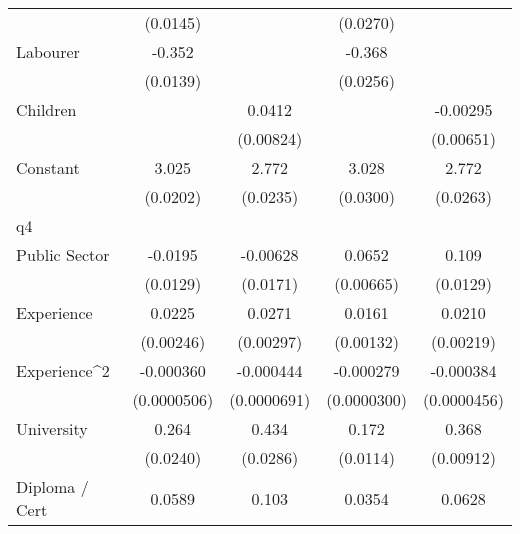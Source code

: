 {\begin{tabular}{l*{4}{c}}
                    &    (0.0145)         &                     &    (0.0270)         &                     \\
[1em]
Labourer            &      -0.352\sym{***}&                     &      -0.368\sym{***}&                     \\
                    &    (0.0139)         &                     &    (0.0256)         &                     \\
[1em]
Children            &                     &      0.0412\sym{***}&                     &    -0.00295         \\
                    &                     &   (0.00824)         &                     &   (0.00651)         \\
[1em]
Constant            &       3.025\sym{***}&       2.772\sym{***}&       3.028\sym{***}&       2.772\sym{***}\\
                    &    (0.0202)         &    (0.0235)         &    (0.0300)         &    (0.0263)         \\
\hline
q4                  &                     &                     &                     &                     \\
Public Sector       &     -0.0195         &    -0.00628         &      0.0652\sym{***}&       0.109\sym{***}\\
                    &    (0.0129)         &    (0.0171)         &   (0.00665)         &    (0.0129)         \\
[1em]
Experience          &      0.0225\sym{***}&      0.0271\sym{***}&      0.0161\sym{***}&      0.0210\sym{***}\\
                    &   (0.00246)         &   (0.00297)         &   (0.00132)         &   (0.00219)         \\
[1em]
Experience^{2}      &   -0.000360\sym{***}&   -0.000444\sym{***}&   -0.000279\sym{***}&   -0.000384\sym{***}\\
                    & (0.0000506)         & (0.0000691)         & (0.0000300)         & (0.0000456)         \\
[1em]
University          &       0.264\sym{***}&       0.434\sym{***}&       0.172\sym{***}&       0.368\sym{***}\\
                    &    (0.0240)         &    (0.0286)         &    (0.0114)         &   (0.00912)         \\
[1em]
Diploma / Cert      &      0.0589\sym{***}&       0.103\sym{***}&      0.0354\sym{**} &      0.0628\sym{***}\\

\end{tabular}}
